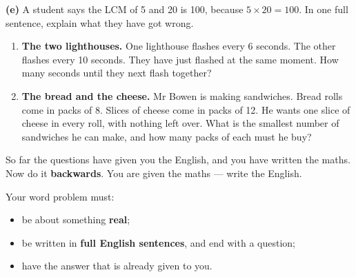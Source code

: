 \documentclass[12pt,a4paper]{article}
\begin{document}
\vspace{6pt}
\noindent\textbf{(e)} A student says the LCM of 5 and 20 is 100, because
$5 \times 20 = 100$. In one full sentence, explain what they have got wrong.


\begin{enumerate}[label=\textbf{\arabic*.}, itemsep=14pt]

  \item \textbf{The two lighthouses.} One lighthouse flashes every 6 seconds. The
        other flashes every 10 seconds. They have just flashed at the same moment.
        How many seconds until they next flash together?
        \begin{workspace}[2.9cm]\end{workspace}

  \item \textbf{The bread and the cheese.} Mr Bowen is making sandwiches. Bread rolls
        come in packs of 8. Slices of cheese come in packs of 12. He wants one slice
        of cheese in every roll, with nothing left over. What is the smallest number
        of sandwiches he can make, and how many packs of each must he buy?
        \begin{workspace}[3.3cm]\end{workspace}

\end{enumerate}


\begin{yourturn}
  So far the questions have given you the English, and you have written the maths.
  Now do it \textbf{backwards}. You are given the maths --- write the English.

  \medskip
  Your word problem must:
  \begin{itemize}
    \item be about something \textbf{real};
    \item be written in \textbf{full English sentences}, and end with a question;
    \item have the answer that is already given to you.
  \end{itemize}
\end{yourturn}
\end{document}
